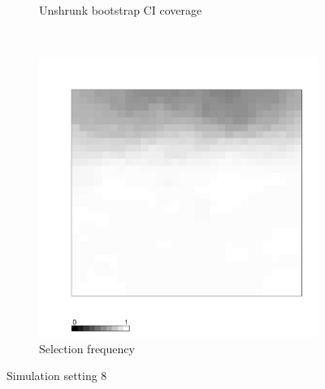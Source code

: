\documentclass[authoryear, review, 11pt]{elsarticle}
\begin{document}
\begin{figure}
\begin{subfigure}[b]{0.45\textwidth}
		\caption{Unshrunk bootstrap CI coverage}
	\end{subfigure}%
	~ %
	\begin{subfigure}[b]{0.45\textwidth}
	\centering
		\includegraphics[width=\textwidth]{../../figures/simulation/X1.15.8.selection.pdf}
		\caption{Selection frequency}
	\end{subfigure}
	\caption{Simulation setting 8}
\end{figure}
	
	\clearpage
	
\end{document}
